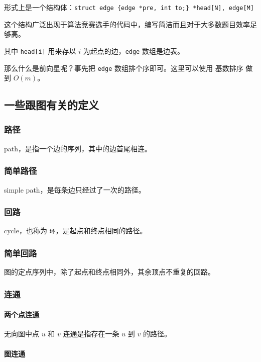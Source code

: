 形式上是一个结构体：\texttt{struct edge \{edge *pre, int to;\} *head[N], edge[M]}

这个结构广泛出现于算法竞赛选手的代码中，编写简洁而且对于大多数题目效率足够高。

其中 \texttt{head[i]} 用来存以 $i$ 为起点的边，\texttt{edge} 数组是边表。

那么什么是前向星呢？事先把 \texttt{edge} 数组排个序即可。这里可以使用  基数排序  做到 $O(m)$。

\subsection{一些跟图有关的定义}

\subsubsection{路径}

path，是指一个边的序列，其中的边首尾相连。

\subsubsection{简单路径}

simple path，是每条边只经过了一次的路径。

\subsubsection{回路}

cycle，也称为 \texttt{环}，是起点和终点相同的路径。

\subsubsection{简单回路}

图的定点序列中，除了起点和终点相同外，其余顶点不重复的回路。

\subsubsection{连通}

\paragraph{两个点连通}

无向图中点 $u$ 和 $v$ 连通是指存在一条 $u$ 到 $v$ 的路径。

\paragraph{图连通}

